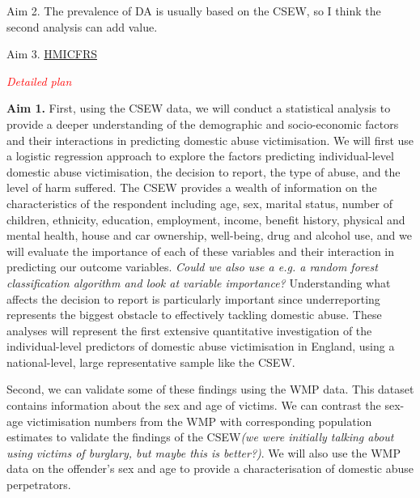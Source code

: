 \documentclass[11pt, a4paper]{article}
\begin{document}
Aim 2. The prevalence of DA is usually based on the CSEW, so I think the second analysis can add value.

Aim 3. \href{https://www.justiceinspectorates.gov.uk/hmicfrs/news/news-feed/little-evidence-of-improvements-in-crime-recording-at-west-midlands-police/}{HMICFRS}

\textcolor{red}{\textit{Detailed plan}}

\textbf{Aim 1.} First, using the CSEW data, we will conduct a statistical analysis to provide a deeper understanding of the demographic and socio-economic factors and their interactions in predicting domestic abuse victimisation. We will first use a logistic regression approach to explore the factors predicting individual-level domestic abuse victimisation, the decision to report, the type of abuse, and the level of harm suffered. The CSEW provides a wealth of information on the characteristics of the respondent including age, sex, marital status, number of children, ethnicity, education, employment, income, benefit history, physical and mental health, house and car ownership, well-being, drug and alcohol use, and we will evaluate the importance of each of these variables and their interaction in predicting our outcome variables. \textit{Could we also use a e.g. a random forest classification algorithm and look at variable importance?} Understanding what affects the decision to report is particularly important since underreporting represents the biggest obstacle to effectively tackling domestic abuse. These analyses will represent the first extensive quantitative investigation of the individual-level predictors of domestic abuse victimisation in England, using a national-level, large representative sample like the CSEW. 

Second, we can validate some of these findings using the WMP data. This dataset contains information about the sex and age of victims. We can contrast the sex-age victimisation numbers from the WMP with corresponding population estimates to validate the findings of the CSEW\textit{(we were initially talking about using victims of burglary, but maybe this is better?)}. We will also use the WMP data on the offender's sex and age to provide a characterisation of domestic abuse perpetrators.

\end{document}
